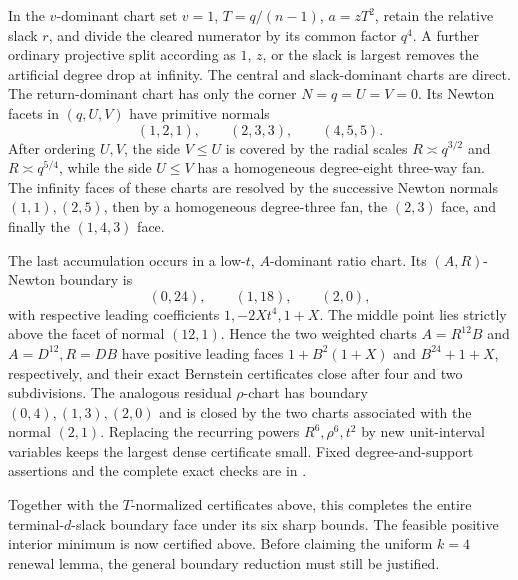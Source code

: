 \documentclass[11pt]{article}
\theoremstyle{remark}
\begin{document}
In the
\(v\)-dominant chart set \(v=1\),
\(T=q/(n-1)\), \(a=zT^2\), retain the relative slack \(r\), and divide the
cleared numerator by its common factor \(q^4\).  A further ordinary
projective split according as \(1\), \(z\), or the slack is largest removes
the artificial degree drop at infinity.  The central and slack-dominant
charts are direct.  The return-dominant chart has only the corner
\(N=q=U=V=0\).  Its Newton facets in \((q,U,V)\) have primitive normals
\[
                  (1,2,1),\qquad(2,3,3),\qquad(4,5,5).
\]
After ordering \(U,V\), the side \(V\leq U\) is covered by the radial scales
\(R\asymp q^{3/2}\) and \(R\asymp q^{5/4}\), while the side \(U\leq V\) has a
homogeneous degree-eight three-way fan.  The infinity faces of these charts
are resolved by the successive Newton normals \((1,1),(2,5)\), then by a
homogeneous degree-three fan, the \((2,3)\) face, and finally the
\((1,4,3)\) face.

The last accumulation occurs in a low-\(t\), \(A\)-dominant ratio chart.  Its
\((A,R)\)-Newton boundary is
\[
                    (0,24),\qquad(1,18),\qquad(2,0),
\]
with respective leading coefficients \(1,-2Xt^4,1+X\).  The middle point
lies strictly above the facet of normal \((12,1)\).  Hence the two weighted
charts \(A=R^{12}B\) and \(A=D^{12},R=DB\) have positive leading faces
\(1+B^2(1+X)\) and \(B^{24}+1+X\), respectively, and their exact Bernstein
certificates close after four and two subdivisions.  The analogous residual
\(\rho\)-chart has boundary \((0,4),(1,3),(2,0)\) and is closed by the two
charts associated with the normal \((2,1)\).  Replacing the recurring powers
\(R^6,\rho^6,t^2\) by new unit-interval variables keeps the largest dense
certificate small.  Fixed degree-and-support assertions and the complete
exact checks are in
.

Together with the \(T\)-normalized certificates above, this completes the
entire terminal-\(d\)-slack boundary face under its six sharp bounds.
The feasible positive interior minimum is now certified above. Before
claiming the uniform \(k=4\) renewal lemma, the general boundary reduction
must still be justified.
\end{document}
